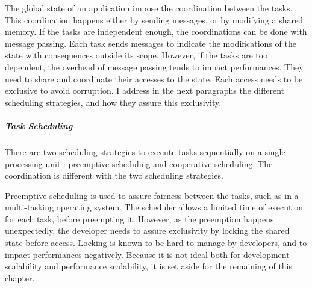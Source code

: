 The global state of an application impose the coordination between the tasks.
This coordination happens either by sending messages, or by modifying a shared memory.
If the tasks are independent enough, the coordinations can be done with message passing.
Each task sends messages to indicate the modifications of the state with consequences outside its scope.
However, if the tasks are too dependent, the overhead of message passing tends to impact performances.
They need to share and coordinate their accesses to the state.
Each access needs to be exclusive to avoid corruption.
I address in the next paragraphs the different scheduling strategies, and how they assure this exclusivity.

\subparagraph{Task Scheduling}

There are two scheduling strategies to execute tasks sequentially on a single processing unit : preemptive scheduling and cooperative scheduling.
The coordination is different with the two scheduling strategies.


Preemptive scheduling is used to assure fairness between the tasks, such as in a multi-tasking operating system.
The scheduler allows a limited time of execution for each task, before preempting it.
However, as the preemption happens unexpectedly, the developer needs to assure exclusivity by locking the shared state before access.
Locking is known to be hard to manage by developers, and to impact performances negatively.
Because it is not ideal both for development scalability and performance scalability, it is set aside for the remaining of this chapter.

